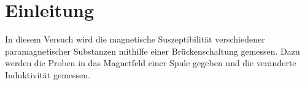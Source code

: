 
\section{Einleitung}

In diesem Versuch wird die magnetische Suszeptibilität verschiedener
paramagnetischer Substanzen mithilfe einer Brückenschaltung
gemessen. Dazu werden die Proben in das Magnetfeld einer Spule gegeben
und die veränderte Induktivität gemessen.
